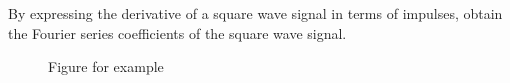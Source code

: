 \begin{frame}
{
}
\end{frame}


\begin{frame}
    \begin{example}
        By expressing the derivative of a square wave signal in terms of impulses, obtain the Fourier series coefficients of the square wave signal.
        \begin{figure}
          \centering
          
          \caption{Figure for example}\label{fi:example3p8_square}
        \end{figure}
    \end{example}
\end{frame}

\begin{frame}
{
}
\end{frame}

